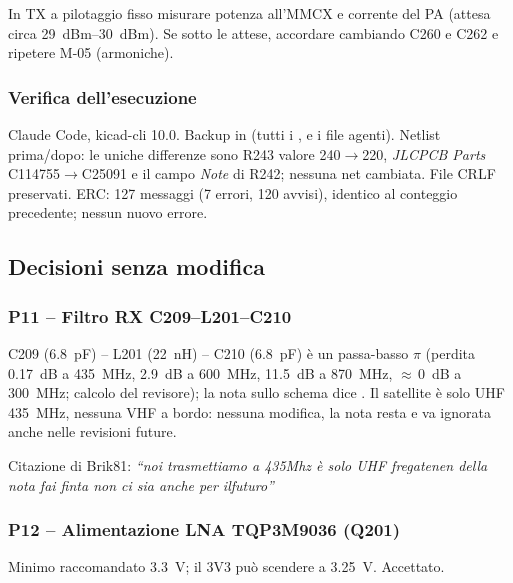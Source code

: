 \begin{tcolorbox}[enhanced,breakable,colback=boxwarnbg,colframe=boxwarn,boxrule=0.8pt,left=7pt,right=6pt,top=3pt,bottom=3pt,
  title={\sffamily\bfseries Misura M-06 al collaudo},fonttitle=\small,coltitle=white,colbacktitle=boxwarn]
In TX a pilotaggio fisso misurare potenza all'MMCX e corrente del PA (attesa circa \SIrange{29}{30}{dBm}). Se sotto le attese, accordare cambiando C260 e C262 e ripetere M-05 (armoniche).
\end{tcolorbox}

\subsubsection{Verifica dell'esecuzione}
Claude Code, kicad-cli 10.0. Backup in  (tutti i ,  e i file agenti). Netlist prima/dopo: le uniche differenze sono R243 valore 240$\rightarrow$220, \emph{JLCPCB Parts} C114755$\rightarrow$C25091 e il campo \emph{Note} di R242; nessuna net cambiata. File CRLF preservati. ERC: 127 messaggi (7 errori, 120 avvisi), identico al conteggio precedente; nessun nuovo errore.

\subsection{Decisioni senza modifica}

\subsubsection{P11 -- Filtro RX C209--L201--C210}
C209 (\SI{6.8}{\pico\farad}) -- L201 (\SI{22}{\nano\henry}) -- C210 (\SI{6.8}{\pico\farad}) è un passa-basso $\pi$ (perdita \SI{0.17}{dB} a \SI{435}{\mega\hertz}, \SI{2.9}{dB} a \SI{600}{\mega\hertz}, \SI{11.5}{dB} a \SI{870}{\mega\hertz}, $\approx$\,\SI{0}{dB} a \SI{300}{\mega\hertz}; calcolo del revisore); la nota sullo schema dice . Il satellite è solo UHF \SI{435}{\mega\hertz}, nessuna VHF a bordo: nessuna modifica, la nota resta e va ignorata anche nelle revisioni future.

Citazione di Brik81: \emph{``noi trasmettiamo a 435Mhz è solo UHF fregatenen della nota fai finta non ci sia anche per ilfuturo''}

\subsubsection{P12 -- Alimentazione LNA TQP3M9036 (Q201)}
Minimo raccomandato \SI{3.3}{V}; il 3V3 può scendere a \SI{3.25}{V}. Accettato.

